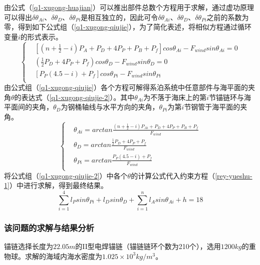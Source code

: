 \documentclass[withoutpreface,bwprint]{cumcmthesis} %
\begin{document}
\par 由公式（\ref{q1-xugong-huajian}）可以推出部件总数个方程用于求解，通过虚功原理可以得出$\delta \theta_{Ai}$、$\delta \theta_{D}$、$\delta \theta_{Pi}$是相互独立的，因此可令$\delta \theta_{Ai}$、$\delta \theta_{D}$、$\delta \theta_{Pi}$之前的系数为零，得到如下公式组（\ref{q1-xugong-qiujie}），为了简化表述，将相似方程通过循环变量$i$的形式表示。
\begin{equation}
	\label{q1-xugong-qiujie}
	\left\{
	\begin{split}
		& \left[ (n + \frac{1}{2} - i)P_A +P_D+4P_P+P_B+P_f \right] cos\theta_{Ai} - F_{wind} sin\theta_{Ai} = 0\\
		& (\frac{1}{2} P_D+4P_P+P_f)cos\theta_D - F_{wind}sin\theta_{D} = 0\\
		& \left[ P_P(4.5-i)+P_f \right] cos\theta_{Pi} - F_{wind} sin \theta_{Pi}\\
	\end{split}
	\right.
\end{equation}
由公式组（\ref{q1-xugong-qiujie}）各个方程可解得系泊系统中任意部件与海平面的夹角$\theta$的表达式（\ref{q1-xugong-qiujie-2}）。其中$\theta_{Ai}$为不落于海床上的第$i$节锚链环与海平面间的夹角，$\theta_D$为钢桶轴线与水平方向的夹角，$\theta_{Pi}$为第$i$节钢管于海平面的夹角。
\begin{equation}
	\label{q1-xugong-qiujie-2}
	\left\{
	\begin{split}
		& \theta_{Ai} = arctan\frac{(n + \frac{1}{2} - i)P_{Ai} +P_D+4P_P+P_B+P_f}{F_{wind}} \\
		& \theta_D = arctan\frac{\frac{1}{2}P_D+4P_P+P_f}{F_{wind}}\\
		& \theta_{Pi} = arctan\frac{P_P(4.5-i)+P_f}{F_{wind}}\\
	\end{split}
	\right.
\end{equation}
将公式组（\ref{q1-xugong-qiujie-2}）中各个$\theta$的计算公式代入约束方程（\ref{rey-yueshu-1}）中进行求解，得到最终结果。
\begin{equation}
	\label{rey-yueshu-1}
	\sum\limits_{i=1}^{4} l_P sin \theta_{Pi} + l_D sin \theta_D + \sum\limits_{i=1}^{n} l_A sin \theta_{Ai} + h = 18
\end{equation}


\subsubsection{该问题的求解与结果分析}
\par 锚链选择长度为$22.05m$的II型电焊锚链（锚链链环个数为210个），选用$1200kg$的重物球。求解的海域内海水密度为$1.025×10^3kg/m^3$。
\end{document}
